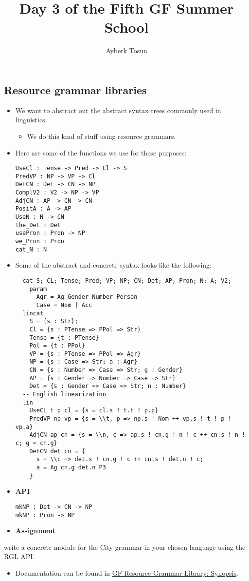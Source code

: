\documentclass[]{article}
\title{Day 3 of the Fifth GF Summer School}
\author{Ayberk Tosun}
\date{}
\providecommand{\tightlist}{%
  \setlength{\itemsep}{0pt}\setlength{\parskip}{0pt}}
\begin{document}
\maketitle

\subsection{Resource grammar
libraries}\label{resource-grammar-libraries}

\begin{itemize}
\item
  We want to abstract out the abstract syntax trees commonly used in
  linguistics.

  \begin{itemize}
  \tightlist
  \item
    We do this kind of stuff using resource grammars.
  \end{itemize}
\item
  Here are some of the functions we use for these purposes:

\begin{verbatim}
UseCl : Tense -> Pred -> Cl -> S
PredVP : NP -> VP -> Cl
DetCN : Det -> CN -> NP
ComplV2 : V2 -> NP -> VP
AdjCN : AP -> CN -> CN
PositA : A -> AP
UseN : N -> CN
the_Det : Det
usePron : Pron -> NP
we_Pron : Pron
cat_N : N
\end{verbatim}
\item
  Some of the abstract and concrete syntax looks like the following:

\begin{verbatim}
  cat S; CL; Tense; Pred; VP; NP; CN; Det; AP; Pron; N; A; V2;
    param
      Agr = Ag Gender Number Person
      Case = Nom | Acc
  lincat
    S = {s : Str};
    Cl = {s : PTense => PPol => Str}
    Tense = {t : PTense}
    Pol = {t : PPol}
    VP = {s : PTense => PPol => Agr}
    NP = {s : Case => Str; a : Agr}
    CN = {s : Number => Case => Str; g : Gender}
    AP = {s : Gender => Number => Case => Str}
    Det = {s : Gender => Case => Str; n : Number}
  -- English linearization
  lin
    UseCL t p cl = {s = cl.s ! t.t ! p.p}
    PredVP np vp = {s = \\t, p => np.s ! Nom ++ vp.s ! t ! p ! vp.a}
    AdjCN ap cn = {s = \\n, c => ap.s ! cn.g ! n ! c ++ cn.s ! n ! c; g = cn.g}
    DetCN det cn = {
      s = \\c => det.s ! cn.g ! c ++ cn.s ! det.n ! c;
      a = Ag cn.g det.n P3
    }
\end{verbatim}
\item
  \textbf{API}

\begin{verbatim}
mkNP : Det -> CN -> NP
mkNP : Pron -> NP
\end{verbatim}
\item
  \textbf{Assignment}
\end{itemize}

write a concrete module for the City grammar in your chosen language
using the RGL API.

\begin{itemize}
\tightlist
\item
  Documentation can be found in
  \href{http://www.grammaticalframework.org/lib/doc/synopsis.html}{GF
  Resource Grammar Library: Synopsis}.
\end{itemize}
\end{document}
